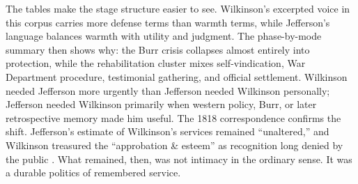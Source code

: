 The tables make the stage structure easier to see. Wilkinson's excerpted voice in this corpus carries more defense terms than warmth terms, while Jefferson's language balances warmth with utility and judgment. The phase-by-mode summary then shows why: the Burr crisis collapses almost entirely into protection, while the rehabilitation cluster mixes self-vindication, War Department procedure, testimonial gathering, and official settlement. Wilkinson needed Jefferson more urgently than Jefferson needed Wilkinson personally; Jefferson needed Wilkinson primarily when western policy, Burr, or later retrospective memory made him useful. The 1818 correspondence confirms the shift. Jefferson's estimate of Wilkinson's services remained ``unaltered,'' and Wilkinson treasured the ``approbation \& esteem'' as recognition long denied by the public \citep{jefferson1818,wilkinson1818}. What remained, then, was not intimacy in the ordinary sense. It was a durable politics of remembered service.
